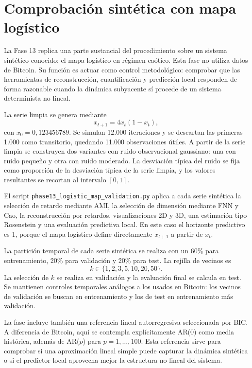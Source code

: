 \section{Comprobación sintética con mapa logístico}\label{sec:validacion-logistica}

La Fase 13 replica una parte sustancial del procedimiento sobre un sistema sintético conocido: el mapa logístico en régimen caótico. Esta fase no utiliza datos de Bitcoin. Su función es actuar como control metodológico: comprobar que las herramientas de reconstrucción, cuantificación y predicción local responden de forma razonable cuando la dinámica subyacente sí procede de un sistema determinista no lineal.

La serie limpia se genera mediante
\begin{equation}
    x_{t+1} = 4x_t(1-x_t),
\end{equation}
con \(x_0=0{,}123456789\). Se simulan 12.000 iteraciones y se descartan las primeras 1.000 como transitorio, quedando 11.000 observaciones útiles. A partir de la serie limpia se construyen dos variantes con ruido observacional gaussiano: una con ruido pequeño y otra con ruido moderado. La desviación típica del ruido se fija como proporción de la desviación típica de la serie limpia, y los valores resultantes se recortan al intervalo \([0,1]\).

El script \texttt{phase13\_\allowbreak logistic\_\allowbreak map\_\allowbreak validation.py} aplica a cada serie sintética la selección de retardo mediante AMI, la selección de dimensión mediante FNN y Cao, la reconstrucción por retardos, visualizaciones 2D y 3D, una estimación tipo Rosenstein y una evaluación predictiva local. En este caso el horizonte predictivo es 1, porque el mapa logístico define directamente \(x_{t+1}\) a partir de \(x_t\).

La partición temporal de cada serie sintética se realiza con un 60\% para entrenamiento, 20\% para validación y 20\% para test. La rejilla de vecinos es
\[
    k \in \{1,2,3,5,10,20,50\}.
\]
La selección de \(k\) se realiza en validación y la evaluación final se calcula en test. Se mantienen controles temporales análogos a los usados en Bitcoin: los vecinos de validación se buscan en entrenamiento y los de test en entrenamiento más validación.

La fase incluye también una referencia lineal autorregresiva seleccionada por BIC. A diferencia de Bitcoin, aquí se contempla explícitamente AR(0) como media histórica, además de AR(\(p\)) para \(p=1,\ldots,100\). Esta referencia sirve para comprobar si una aproximación lineal simple puede capturar la dinámica sintética o si el predictor local aprovecha mejor la estructura no lineal del sistema.

